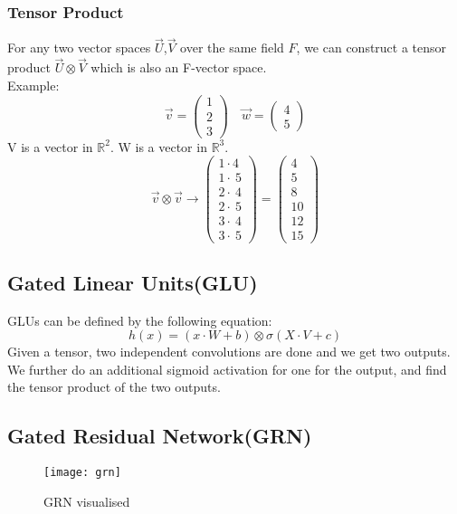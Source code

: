 \documentclass{article}
\begin{document}
\subsubsection{Tensor Product}
For any two vector spaces $\vec{U}$,$\vec{V}$ over the same field $F$, we can construct a tensor product $\vec{U}\otimes\vec{V}$ which is also an F-vector space.\\
Example:
$$\vec{v}=\begin{pmatrix}1\\ 2\\ 3\end{pmatrix}\quad \vec{w}=\begin{pmatrix}4\\ 5\end{pmatrix}$$
V is a vector in $\mathbb{R}^{2}$. W is a vector in $\mathbb{R}^{3}$.
$$\vec{v}\otimes\vec{v} \rightarrow \begin{pmatrix}1\cdot 4\\ 1\cdot \:5\\ 2\cdot \:4\\ 2\cdot \:5\\ 3\cdot \:4\\ 3\cdot \:5\end{pmatrix}=\begin{pmatrix}4\\ 5\\ 8\\ 10\\ 12\\ 15\end{pmatrix}$$

\subsection{Gated Linear Units(GLU)}
GLUs can be defined by the following equation:
$$h(x)=(x\cdot W +b)\otimes \sigma(X\cdot V+c)$$
Given a tensor, two independent convolutions are done and we get two outputs. We further do an additional sigmoid activation for one for the output, and find the tensor product of the two outputs.


\subsection{Gated Residual Network(GRN)}
\begin{figure}[h]
    \centering
    \texttt{[image: grn]}
    \caption{GRN visualised}
\end{figure}
\end{document}
